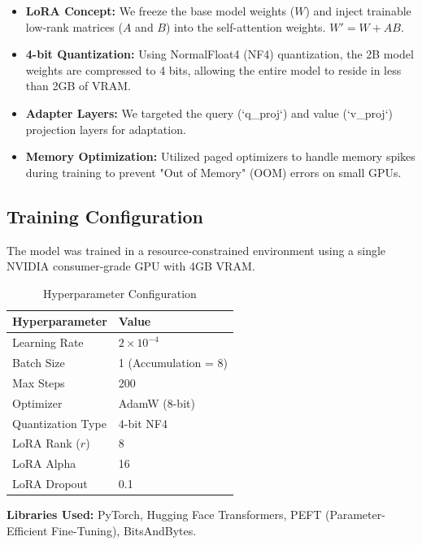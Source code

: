 \documentclass[12pt,a4paper]{article}
\begin{document}
\begin{itemize}
    \item \textbf{LoRA Concept:} We freeze the base model weights ($W$) and inject trainable low-rank matrices ($A$ and $B$) into the self-attention weights. $W' = W + AB$.
    \item \textbf{4-bit Quantization:} Using NormalFloat4 (NF4) quantization, the 2B model weights are compressed to 4 bits, allowing the entire model to reside in less than 2GB of VRAM.
    \item \textbf{Adapter Layers:} We targeted the query (`q_proj`) and value (`v_proj`) projection layers for adaptation.
    \item \textbf{Memory Optimization:} Utilized paged optimizers to handle memory spikes during training to prevent "Out of Memory" (OOM) errors on small GPUs.
\end{itemize}

\subsection{Training Configuration}
The model was trained in a resource-constrained environment using a single NVIDIA consumer-grade GPU with 4GB VRAM.

\begin{table}[H]
    \centering
    \caption{Hyperparameter Configuration}
    \begin{tabular}{ll}
        \toprule
        \textbf{Hyperparameter} & \textbf{Value} \\
        \midrule
        Learning Rate & $2 \times 10^{-4}$ \\
        Batch Size & 1 (Accumulation = 8) \\
        Max Steps & 200 \\
        Optimizer & AdamW (8-bit) \\
        Quantization Type & 4-bit NF4 \\
        LoRA Rank ($r$) & 8 \\
        LoRA Alpha & 16 \\
        LoRA Dropout & 0.1 \\
        \bottomrule
    \end{tabular}
\end{table}

\textbf{Libraries Used:} PyTorch, Hugging Face Transformers, PEFT (Parameter-Efficient Fine-Tuning), BitsAndBytes.
\end{document}
